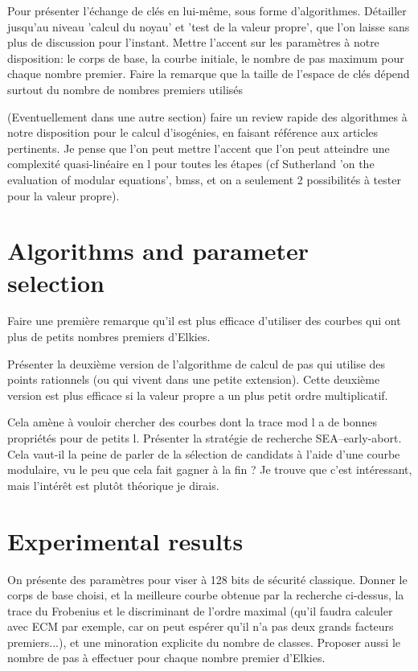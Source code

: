 \documentclass{article}
\begin{document}
Pour présenter l'échange de clés en lui-même, sous forme
d'algorithmes.  Détailler jusqu'au niveau 'calcul du noyau' et 'test
de la valeur propre', que l'on laisse sans plus de discussion pour
l'instant.  Mettre l'accent sur les paramètres à notre disposition: le
corps de base, la courbe initiale, le nombre de pas maximum pour
chaque nombre premier.  Faire la remarque que la taille de l'espace de
clés dépend surtout du nombre de nombres premiers utilisés

(Eventuellement dans une autre section) faire un review rapide des
algorithmes à notre disposition pour le calcul d'isogénies, en faisant
référence aux articles pertinents.  Je pense que l'on peut mettre
l'accent que l'on peut atteindre une complexité quasi-linéaire en l
pour toutes les étapes (cf Sutherland 'on the evaluation of modular
equations', bmss, et on a seulement 2 possibilités à tester pour la
valeur propre).

\section{Algorithms and parameter selection}

Faire une première remarque qu'il est plus efficace d'utiliser des
courbes qui ont plus de petits nombres premiers d'Elkies.

Présenter la deuxième version de l'algorithme de calcul de pas qui
utilise des points rationnels (ou qui vivent dans une petite
extension). Cette deuxième version est plus efficace si la valeur
propre a un plus petit ordre multiplicatif.

Cela amène à vouloir chercher des courbes dont la trace mod l a de
bonnes propriétés pour de petits l. Présenter la stratégie de
recherche SEA--early-abort. Cela vaut-il la peine de parler de la
sélection de candidats à l'aide d'une courbe modulaire, vu le peu que
cela fait gagner à la fin ? Je trouve que c'est intéressant, mais
l'intérêt est plutôt théorique je dirais.

\section{Experimental results}

On présente des paramètres pour viser à 128 bits de sécurité
classique.  Donner le corps de base choisi, et la meilleure courbe
obtenue par la recherche ci-dessus, la trace du Frobenius et le
discriminant de l'ordre maximal (qu'il faudra calculer avec ECM par
exemple, car on peut espérer qu'il n'a pas deux grands facteurs
premiers...), et une minoration explicite du nombre de classes.
Proposer aussi le nombre de pas à effectuer pour chaque nombre premier
d'Elkies.
\end{document}
